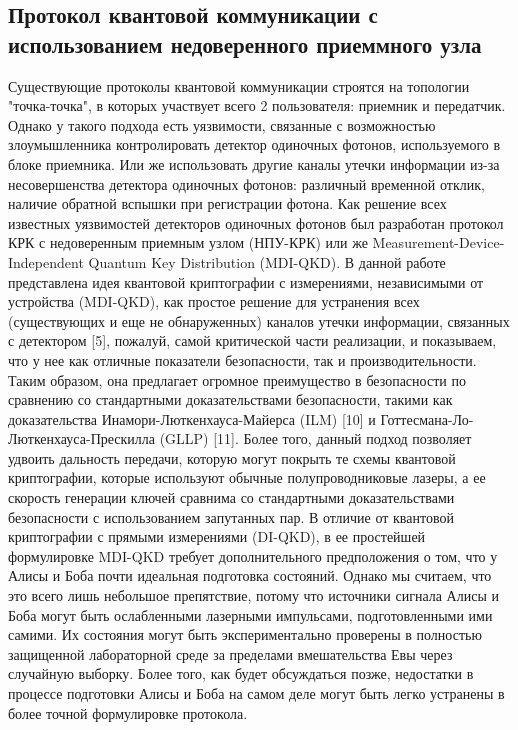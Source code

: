 \subsection{Протокол квантовой коммуникации с использованием недоверенного приеммного узла} \label{sec:ch1/sect2/MDI QKD}
Существующие протоколы квантовой коммуникации строятся на топологии "точка-точка", в которых участвует всего 2 пользователя: приемник и передатчик. Однако у такого подхода есть уязвимости, связанные  с возможностью злоумышленника контролировать детектор одиночных фотонов, используемого в блоке приемника. Или же использовать другие каналы утечки информации из-за несовершенства детектора одиночных фотонов: различный временной отклик, наличие обратной вспышки при регистрации фотона. Как решение всех известных уязвимостей детекторов одиночных фотонов был разработан протокол КРК с недоверенным приемным узлом (НПУ-КРК) или же Measurement-Device-Independent Quantum Key Distribution (MDI-QKD). 
\newline В данной работе представлена идея квантовой криптографии с измерениями, независимыми от устройства (MDI-QKD), как простое решение для устранения всех (существующих и еще не обнаруженных) каналов утечки информации, связанных с детектором [5], пожалуй, самой критической части реализации, и показываем, что у нее как отличные показатели безопасности, так и производительности. Таким образом, она предлагает огромное преимущество в безопасности по сравнению со стандартными доказательствами безопасности, такими как доказательства Инамори-Люткенхауса-Майерса (ILM) [10] и Готтесмана-Ло-Люткенхауса-Прескилла (GLLP) [11]. Более того, данный подход позволяет удвоить дальность передачи, которую могут покрыть те схемы квантовой криптографии, которые используют обычные полупроводниковые лазеры, а ее скорость генерации ключей сравнима со стандартными доказательствами безопасности с использованием запутанных пар. В отличие от квантовой криптографии с прямыми измерениями (DI-QKD), в ее простейшей формулировке MDI-QKD требует дополнительного предположения о том, что у Алисы и Боба почти идеальная подготовка состояний. Однако мы считаем, что это всего лишь небольшое препятствие, потому что источники сигнала Алисы и Боба могут быть ослабленными лазерными импульсами, подготовленными ими самими. Их состояния могут быть экспериментально проверены в полностью защищенной лабораторной среде за пределами вмешательства Евы через случайную выборку. Более того, как будет обсуждаться позже, недостатки в процессе подготовки Алисы и Боба на самом деле могут быть легко устранены в более точной формулировке протокола.
